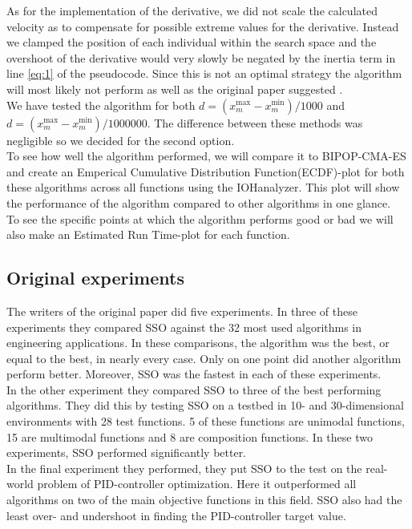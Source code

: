 \documentclass[runningheads]{llncs}
\begin{document}
As for the implementation of the derivative, we did not scale the calculated velocity as to compensate for possible extreme values for the derivative. Instead we clamped the position of each individual within the search space and the overshoot of the derivative would very slowly be negated by the inertia term in line \ref{eq:1} of the pseudocode. Since this is not an optimal strategy the algorithm will most likely not perform as well as the original paper suggested \cite{abedinia2014shark}. \\
We have tested the algorithm for both $d = (x_m^{\text{max}}-x_m^{\text{min}})/1000$ and $d = (x_m^{\text{max}}-x_m^{\text{min}})/1000000$. The difference between these methods was negligible so we decided for the second option.\\

To see how well the algorithm performed, we will compare it to BIPOP-CMA-ES \cite{COCOperformace} and create an Emperical Cumulative Distribution Function(ECDF)-plot for both these algorithms across all functions using the IOHanalyzer. This plot will show the performance of the algorithm compared to other algorithms in one glance.\\
To see the specific points at which the algorithm performs good or bad we will also make an Estimated Run Time-plot for each function.\\


\subsection{Original experiments}
The writers of the original paper did five experiments. In three of these experiments they compared SSO against the 32 most used algorithms in engineering applications. In these comparisons, the algorithm was the best, or equal to the best, in nearly every case. Only on one point did another algorithm perform better. Moreover, SSO was the fastest in each of these experiments. \\
In the other experiment they compared SSO to three of the best performing algorithms. They did this by testing SSO on a testbed in 10- and 30-dimensional environments with 28 test functions. 5 of these functions are unimodal functions, 15 are multimodal functions and 8 are composition functions. In these two experiments, SSO performed significantly better.\\
In the final experiment they performed, they put SSO to the test on the real-world problem of PID-controller optimization. Here it outperformed all algorithms on two of the main objective functions in this field. SSO also had the least over- and undershoot in finding the PID-controller target value.
\end{document}
